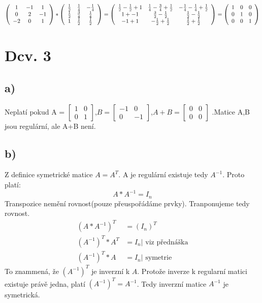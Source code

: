 \documentclass[a4paper]{article}
\begin{document}
\begin{align*}
\left(
\begin{array}{ c c c }
    1 & -1 & 1\\
    0 & 2 & -1 \\
    -2 & 0 & 1
\end{array}
\right)
*
\left(
\begin{array}{ c c c }
     \frac{1}{2} & \frac{1}{4} & -\frac{1}{4}\\
    \frac{1}{2} & \frac{3}{4} & \frac{1}{4}\\
    1 & \frac{1}{2} & \frac{1}{2}
\end{array}
\right)
=
\left(
\begin{array}{c c c}
    \frac{1}{2} - \frac{1}{2} + 1 & \frac{1}{4} - \frac{3}{4} + \frac{1}{2} & -\frac{1}{4} -\frac{1}{4} + \frac{1}{2}\\
    1 + -1 & \frac{3}{2} - \frac{1}{2} & \frac{1}{2} - \frac{1}{2}\\
    -1 + 1 & -\frac{1}{2} + \frac{1}{2} & \frac{1}{2} + \frac{1}{2}
\end{array}
\right)
=
\left(
    \begin{array}{c c c}
        1 & 0 & 0\\
        0 & 1 & 0\\
        0 & 0 & 1
    \end{array}
\right)
\end{align*}
\section{Dcv. 3}
\subsection{a)}
Neplatí pokud A = 
$
\begin{bmatrix}
    1 & 0 \\
    0 & 1
\end{bmatrix}
$,$ B =
\begin{bmatrix}
    -1 & 0 \\
    0 & -1
\end{bmatrix}
$,$ A+B=
\begin{bmatrix}
    0 & 0\\
    0 & 0
\end{bmatrix}$
.Matice A,B jsou regulární, ale A+B není.
\subsection{b)}
Z definice symetrické matice $A=A^{T}$.
A je regulární existuje tedy $A^{-1}$.
Proto platí:
\begin{equation}
    A*A^{-1}=I_n
\end{equation}
Transpozice nemění rovnost(pouze přeuspořádáme prvky).
Tranponujeme tedy rovnost.
\begin{align*}
    (A*A^{-1})^T&=(I_n)^T\\
    (A^{-1})^T * A^T &=I_n \text{| viz přednáška}\\
    (A^{-1})^T * A &=I_n \text{| symetrie}
\end{align*}
To znammená, že $(A^{-1})^T$ je inverzní k $A$.
Protože inverze k regularní matici existuje právě jedna, platí $(A^{-1})^T = A^{-1}$.
Tedy inverzní matice $A^{-1}$ je symetrická.
\end{document}
